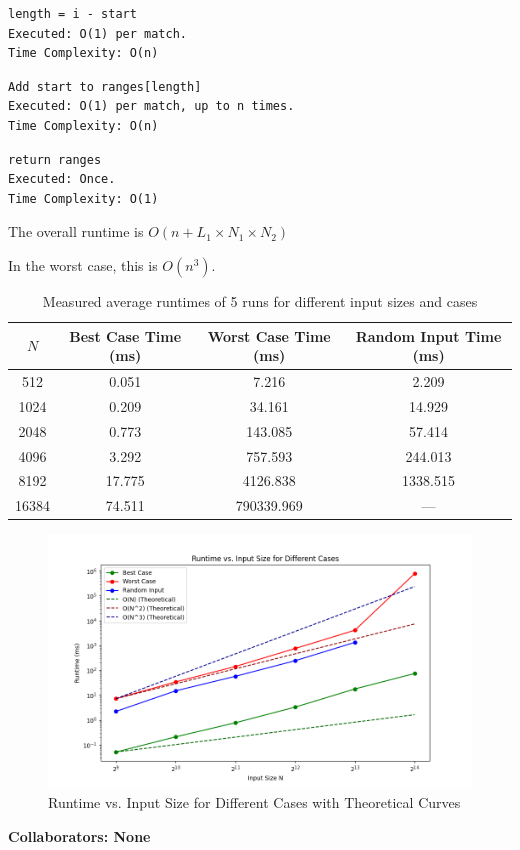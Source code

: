 \documentclass[12 pt]{article}
\begin{document}
\begin{verbatim}
length = i - start
Executed: O(1) per match.
Time Complexity: O(n)
\end{verbatim}

\begin{verbatim}
Add start to ranges[length]
Executed: O(1) per match, up to n times.
Time Complexity: O(n)
\end{verbatim}

\begin{verbatim}
return ranges
Executed: Once.
Time Complexity: O(1)
\end{verbatim}

The overall runtime is $O(n + L_1 \times N_1 \times N_2)$

In the worst case, this is $O(n^3)$.

\begin{table}[h!]
\centering
\begin{tabular}{|c|c|c|c|}
\hline
$N$ & Best Case Time (ms) & Worst Case Time (ms) & Random Input Time (ms) \\
\hline
512   & 0.051    & 7.216      & 2.209     \\
\hline
1024  & 0.209    & 34.161     & 14.929    \\
\hline
2048  & 0.773    & 143.085    & 57.414    \\
\hline
4096  & 3.292    & 757.593    & 244.013   \\
\hline
8192  & 17.775   & 4126.838   & 1338.515  \\
\hline
16384 & 74.511   & 790339.969 & ---       \\
\hline
\end{tabular}
\caption{Measured average runtimes of 5 runs for different input sizes and cases}
\label{tab:runtime_data}
\end{table}

\begin{figure}[h!]
  \centering
  \includegraphics[width=\textwidth]{Q5.png}
  \caption{Runtime vs. Input Size for Different Cases with Theoretical Curves}
  \label{fig:runtime_plot}
\end{figure}


\noindent\textbf{Collaborators: None}
\end{document}

